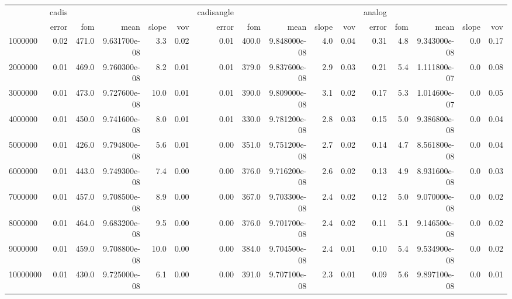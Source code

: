 \begin{tabular}{lrrrrrrrrrrrrrrr}
\toprule
{} & cadis &       &               &       &      & cadisangle &       &               &       &      & analog &     &               &       &      \\
{} & error &   fom &          mean & slope &  vov &      error &   fom &          mean & slope &  vov &  error & fom &          mean & slope &  vov \\
\midrule
1000000  &  0.02 & 471.0 &  9.631700e-08 &   3.3 & 0.02 &       0.01 & 400.0 &  9.848000e-08 &   4.0 & 0.04 &   0.31 & 4.8 &  9.343000e-08 &   0.0 & 0.17 \\
2000000  &  0.01 & 469.0 &  9.760300e-08 &   8.2 & 0.01 &       0.01 & 379.0 &  9.837600e-08 &   2.9 & 0.03 &   0.21 & 5.4 &  1.111800e-07 &   0.0 & 0.08 \\
3000000  &  0.01 & 473.0 &  9.727600e-08 &  10.0 & 0.01 &       0.01 & 390.0 &  9.809000e-08 &   3.1 & 0.02 &   0.17 & 5.3 &  1.014600e-07 &   0.0 & 0.05 \\
4000000  &  0.01 & 450.0 &  9.741600e-08 &   8.0 & 0.01 &       0.01 & 330.0 &  9.781200e-08 &   2.8 & 0.03 &   0.15 & 5.0 &  9.386800e-08 &   0.0 & 0.04 \\
5000000  &  0.01 & 426.0 &  9.794800e-08 &   5.6 & 0.01 &       0.00 & 351.0 &  9.751200e-08 &   2.7 & 0.02 &   0.14 & 4.7 &  8.561800e-08 &   0.0 & 0.04 \\
6000000  &  0.01 & 443.0 &  9.749300e-08 &   7.4 & 0.00 &       0.00 & 376.0 &  9.716200e-08 &   2.6 & 0.02 &   0.13 & 4.9 &  8.931600e-08 &   0.0 & 0.03 \\
7000000  &  0.01 & 457.0 &  9.708500e-08 &   8.9 & 0.00 &       0.00 & 367.0 &  9.703300e-08 &   2.4 & 0.02 &   0.12 & 5.0 &  9.070000e-08 &   0.0 & 0.02 \\
8000000  &  0.01 & 464.0 &  9.683200e-08 &   9.5 & 0.00 &       0.00 & 376.0 &  9.701700e-08 &   2.4 & 0.02 &   0.11 & 5.1 &  9.146500e-08 &   0.0 & 0.02 \\
9000000  &  0.01 & 459.0 &  9.708800e-08 &  10.0 & 0.00 &       0.00 & 384.0 &  9.704500e-08 &   2.4 & 0.01 &   0.10 & 5.4 &  9.534900e-08 &   0.0 & 0.02 \\
10000000 &  0.01 & 430.0 &  9.725000e-08 &   6.1 & 0.00 &       0.00 & 391.0 &  9.707100e-08 &   2.3 & 0.01 &   0.09 & 5.6 &  9.897100e-08 &   0.0 & 0.01 \\
\bottomrule
\end{tabular}
